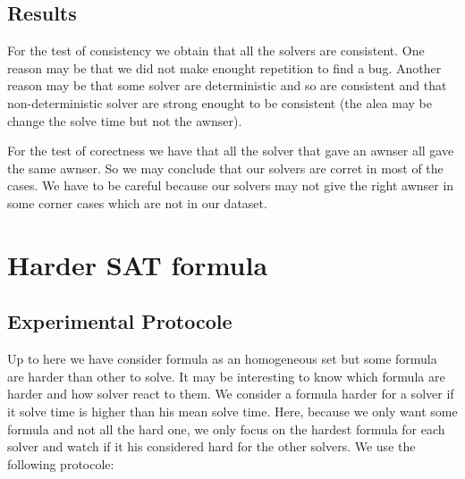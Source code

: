 \documentclass{article}
\begin{document}
\subsection{Results}

For the test of consistency we obtain that all the solvers are consistent. One reason may be that we did not make enought repetition to find a bug. Another reason may be that some solver are deterministic  and so are consistent and that non-deterministic solver are strong enought to be consistent (the alea may be  change the solve time but not the awnser).

For the test of corectness we have that all the solver that gave an awnser all gave the same awnser. So we may conclude that our solvers are corret in most of the cases. We have to be careful because our solvers may not give the right awnser in some corner cases which are not in our dataset. 







\section{Harder SAT formula}
\subsection{Experimental Protocole}
Up to here we have consider formula as an homogeneous set but some formula are harder than other to solve. It may be interesting to know which formula are harder and how solver react to them. We consider a formula harder for a solver if it solve time is higher than his mean solve time. Here, because we only want some formula and not all the hard one, we only focus on the hardest formula for each solver and watch if it his considered hard for the other solvers. We use the following protocole:
\end{document}
